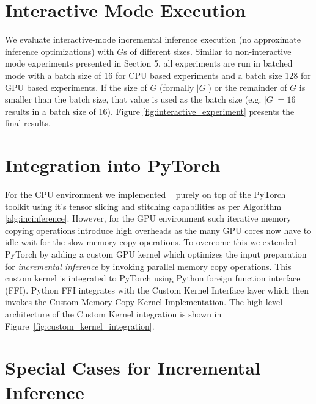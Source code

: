 \appendix

\section{Interactive Mode Execution}

We evaluate interactive-mode incremental inference execution (no approximate inference optimizations) with $G$s of different sizes.
Similar to non-interactive mode experiments presented in Section 5, all experiments are run in batched mode with a batch size of 16 for CPU based experiments and a batch size 128 for GPU based experiments.
If the size of $G$ (formally $|G|$) or the remainder of $G$ is smaller than the batch size, that value is used as the batch size (e.g. $|G| = 16$ results in a batch size of 16).
Figure \ref{fig:interactive_experiment} presents the final results.

\section{Integration into PyTorch}\label{sec:pytorch_integration}
For the CPU environment we implemented \system~ purely on top of the PyTorch toolkit using it's tensor slicing and stitching capabilities as per Algorithm \ref{alg:incinference}.
However, for the GPU environment such iterative memory copying operations introduce high overheads as the many GPU cores now have to idle wait for the slow memory copy operations.
To overcome this we extended PyTorch by adding a custom GPU kernel which optimizes the input preparation for \textit{incremental inference} by invoking parallel memory copy operations.
This custom kernel is integrated to PyTorch using Python foreign function interface (FFI).
Python FFI integrates with the Custom Kernel Interface layer which then invokes the Custom Memory Copy Kernel Implementation.
The high-level architecture of the Custom Kernel integration is shown in Figure~\ref{fig:custom_kernel_integration}.

\section{Special Cases for Incremental Inference}

